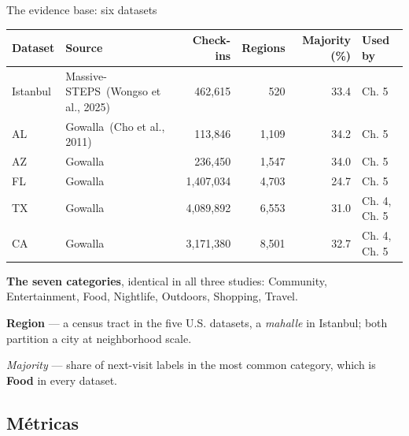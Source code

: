 \documentclass{beamer}
\begin{document}
\begin{frame}{The evidence base: six datasets}
    \centering
    \small
    \renewcommand{\arraystretch}{1.15}\begin{tabular}{@{}llrrrl@{}}
        \toprule
        Dataset & Source & Check-ins & Regions & Majority (\%) & Used by \\
        \midrule
        Istanbul & Massive-STEPS~{\scriptsize(Wongso et al., 2025)} & 462,615   & 520   & 33.4 & Ch. 5 \\
        AL       & Gowalla~{\scriptsize(Cho et al., 2011)}       & 113,846   & 1,109 & 34.2 & Ch. 5 \\
        AZ       & Gowalla       & 236,450   & 1,547 & 34.0 & Ch. 5 \\
        FL       & Gowalla       & 1,407,034 & 4,703 & 24.7 & Ch. 5 \\
        TX       & Gowalla       & 4,089,892 & 6,553 & 31.0 & Ch. 4, Ch. 5 \\
        CA       & Gowalla       & 3,171,380 & 8,501 & 32.7 & Ch. 4, Ch. 5 \\
        \bottomrule
    \end{tabular}

    \medskip
    \raggedright
    \footnotesize
    \textbf{The seven categories}, identical in all three studies: Community, Entertainment,
    Food, Nightlife, Outdoors, Shopping, Travel.\par
    \smallskip
    \textbf{Region} --- a census tract in the five U.S. datasets, a \textit{mahalle} in Istanbul;
    both partition a city at neighborhood scale.\par
    \smallskip
    \textit{Majority} --- share of next-visit labels in the most common category, which is
    \textbf{Food} in every dataset.\par
\end{frame}

\subsection{Métricas}
\end{document}
